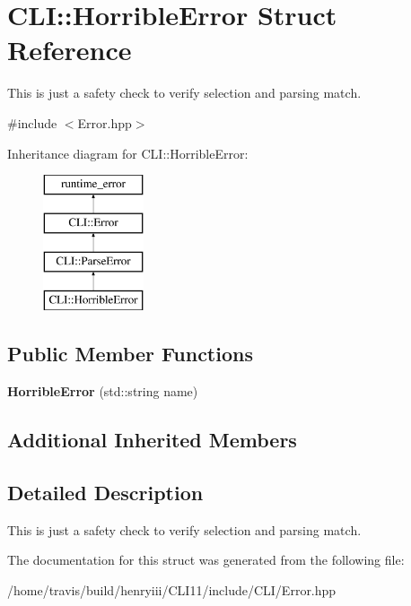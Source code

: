\hypertarget{struct_c_l_i_1_1_horrible_error}{}\section{C\+LI\+:\+:Horrible\+Error Struct Reference}
\label{struct_c_l_i_1_1_horrible_error}


This is just a safety check to verify selection and parsing match.  




{\ttfamily \#include $<$Error.\+hpp$>$}

Inheritance diagram for C\+LI\+:\+:Horrible\+Error\+:\begin{figure}[H]
\begin{center}
\leavevmode
\includegraphics[height=4.000000cm]{struct_c_l_i_1_1_horrible_error}
\end{center}
\end{figure}
\subsection*{Public Member Functions}
\begin{DoxyCompactItemize}
\item 
\mbox{\label{struct_c_l_i_1_1_horrible_error_a4883192c5b7e3f2a263caf24a09a86ec}} 
{\bfseries Horrible\+Error} (std\+::string name)
\end{DoxyCompactItemize}
\subsection*{Additional Inherited Members}


\subsection{Detailed Description}
This is just a safety check to verify selection and parsing match. 

The documentation for this struct was generated from the following file\+:\begin{DoxyCompactItemize}
\item 
/home/travis/build/henryiii/\+C\+L\+I11/include/\+C\+L\+I/Error.\+hpp\end{DoxyCompactItemize}
